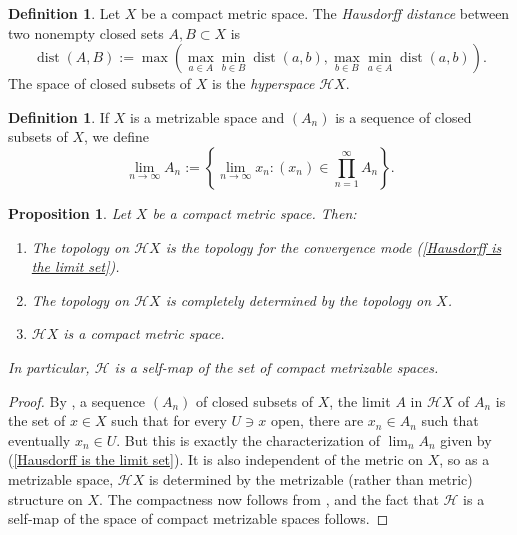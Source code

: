 \documentclass[reqno,11pt]{amsart}
\DeclareMathOperator{\dist}{dist}
\newcommand{\Hypspace}{\mathscr H}
\newcommand{\dfn}[1]{\emph{#1}\index{#1}}
\newtheorem{proposition}[theorem]{Proposition}
\theoremstyle{definition}
\newtheorem{definition}[theorem]{Definition}
\numberwithin{equation}{section}
\begin{document}
\begin{definition}
Let $X$ be a compact metric space. The \dfn{Hausdorff distance} between two nonempty closed sets $A, B \subset X$ is
\begin{equation}\label{compact hausdorff distance}
	\dist(A, B) := \max\left(\max_{a \in A} \min_{b \in B} \dist(a, b), \max_{b \in B} \min_{a \in A} \dist(a, b)\right).
\end{equation}
The space of closed subsets of $X$ is the \dfn{hyperspace} $\Hypspace X$.
\end{definition}

\begin{definition}
If $X$ is a metrizable space and $(A_n)$ is a sequence of closed subsets of $X$, we define
\begin{equation}\label{Hausdorff is the limit set}
\lim_{n \to \infty} A_n := \left \{ \lim_{n \to \infty} x_n: (x_n) \in \prod_{n=1}^\infty A_n\right\}.
\end{equation}
\end{definition}

\begin{proposition}\label{Hausdorff on a CMS}
Let $X$ be a compact metric space. Then:
\begin{enumerate}
\item The topology on $\Hypspace X$ is the topology for the convergence mode (\ref{Hausdorff is the limit set}).
\item The topology on $\Hypspace X$ is completely determined by the topology on $X$.
\item $\Hypspace X$ is a compact metric space.
\end{enumerate}
In particular, $\Hypspace$ is a self-map of the set of compact metrizable spaces.
\end{proposition}
\begin{proof}
By \cite[Theorem 4.11]{nadler2017continuum}, a sequence $(A_n)$ of closed subsets of $X$, the limit $A$ in $\Hypspace X$ of $A_n$ is the set of $x \in X$ such that for every $U \ni x$ open, there are $x_n \in A_n$ such that eventually $x_n \in U$.
But this is exactly the characterization of $\lim_n A_n$ given by (\ref{Hausdorff is the limit set}).
It is also independent of the metric on $X$, so as a metrizable space, $\Hypspace X$ is determined by the metrizable (rather than metric) structure on $X$.
The compactness now follows from \cite[Theorem 4.17]{nadler2017continuum}, and the fact that $\Hypspace$ is a self-map of the space of compact metrizable spaces follows.
\end{proof}
\end{document}
